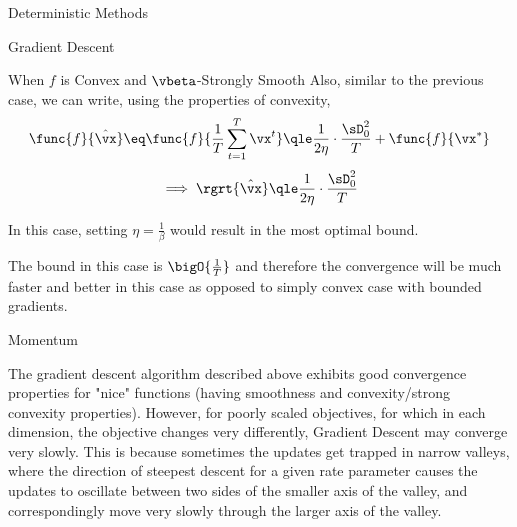 \documentclass{article}
\begin{document}
\begin{psection}{Deterministic Methods}
\begin{psubsection}{Gradient Descent}
\begin{pssubsection}{When $f$ is Convex and $\vbeta$-Strongly Smooth}
			Also, similar to the previous case, we can write, using the properties of convexity,
			\begin{align*}
				\func{f}{\hat{\vx}} \eq \func{f}{\frac{1}{T} \sum_{t = 1}^T \x{t}}	\qle	\frac{1}{2 \eta} \cdot \frac{\sD_0^2}{T} + \func{f}{\xs}
			\end{align*}
			\begin{equation}
				\implies \rgrt{\hat{\vx}}	\qle	\frac{1}{2 \eta} \cdot \frac{\sD_0^2}{T}
				\label{eq:gd-2-bound}
			\end{equation}

			\begin{remark}
				In this case, setting $\eta = \frac{1}{\beta}$ would result in the most optimal bound.
			\end{remark}

			\begin{remark}
				The bound in this case is $\bigO{\frac{1}{T}}$ and therefore the convergence will be much faster and better in this case as opposed to simply convex case with bounded gradients.
			\end{remark}

		\end{pssubsection}

	\end{psubsection}

	\begin{psubsection}{Momentum}

		The gradient descent algorithm described above exhibits good convergence properties for "nice" functions (having smoothness and convexity/strong convexity properties). However, for poorly scaled objectives, for which in each dimension, the objective changes very differently, Gradient Descent may converge very slowly. This is because sometimes the updates get trapped in narrow valleys, where the direction of steepest descent for a given rate parameter causes the updates to oscillate between two sides of the smaller axis of the valley, and correspondingly move very slowly through the larger axis of the valley. \cite{gd-overview}


\end{psubsection}
\end{psection}
\end{document}

